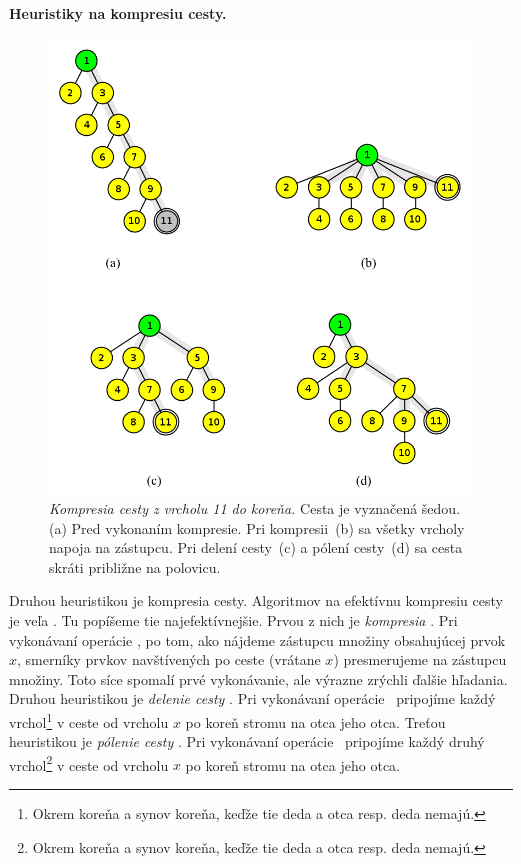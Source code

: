 \paragraph{Heuristiky na kompresiu cesty.}

\begin{figure}
\includegraphics[width=\columnwidth]{obrazky/komp.png}
\caption{\emph{Kompresia cesty z vrcholu 11 do koreňa.} 
Cesta je vyznačená šedou. 
(a) Pred vykonaním kompresie. Pri kompresii~(b) sa všetky vrcholy napoja 
na zástupcu. Pri delení cesty~(c) a pólení cesty~(d) sa cesta skráti 
približne na polovicu.} 
\label{img:komp} 
\end{figure}

Druhou heuristikou je kompresia cesty. Algoritmov na efektívnu kompresiu 
cesty je veľa \citep{paths2}. Tu popíšeme tie najefektívnejšie. Prvou z nich 
je \emph{kompresia} \citep{comp1}. Pri vykonávaní 
operácie \find, po tom, 
ako nájdeme zástupcu množiny obsahujúcej prvok $x$, smerníky prvkov 
navštívených po ceste (vrátane $x$) presmerujeme na zástupcu množiny. Toto 
síce spomalí prvé vykonávanie, ale výrazne zrýchli ďalšie hľadania. 
Druhou heuristikou je \emph{delenie cesty} \citep{comp2}. Pri vykonávaní 
operácie \find\ 
pripojíme každý vrchol\footnote{Okrem koreňa a synov koreňa, 
keďže tie deda a otca resp. deda nemajú.} v ceste od vrcholu $x$ po koreň stromu 
na otca jeho otca. 
Treťou heuristikou je \emph{pólenie cesty} \citep{comp2}. Pri vykonávaní 
operácie \find\ 
pripojíme každý druhý vrchol\footnote{Okrem koreňa a synov koreňa, 
keďže tie deda a otca resp. deda nemajú.} 
v ceste od vrcholu $x$ po koreň stromu na otca jeho otca. 

